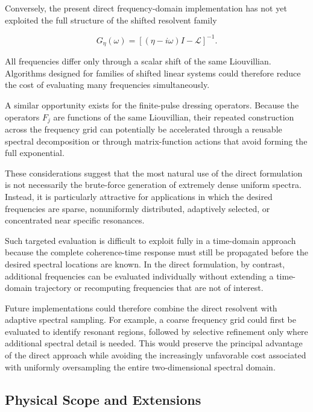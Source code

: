 \documentclass[11pt]{article}
\begin{document}
Conversely, the present direct frequency-domain implementation has not
yet exploited the full structure of the shifted resolvent family

\begin{equation}
G_\eta(\omega)
=
\left[
(\eta-i\omega)I-\mathcal{L}
\right]^{-1}.
\end{equation}

All frequencies differ only through a scalar shift of the same
Liouvillian.  Algorithms designed for families of shifted linear
systems could therefore reduce the cost of evaluating many frequencies
simultaneously.

A similar opportunity exists for the finite-pulse dressing operators.
Because the operators $F_j$ are functions of the same Liouvillian,
their repeated construction across the frequency grid can potentially
be accelerated through a reusable spectral decomposition or through
matrix-function actions that avoid forming the full exponential.

These considerations suggest that the most natural use of the direct
formulation is not necessarily the brute-force generation of extremely
dense uniform spectra.  Instead, it is particularly attractive for
applications in which the desired frequencies are sparse,
nonuniformly distributed, adaptively selected, or concentrated near
specific resonances.

Such targeted evaluation is difficult to exploit fully in a
time-domain approach because the complete coherence-time response must
still be propagated before the desired spectral locations are known.
In the direct formulation, by contrast, additional frequencies can be
evaluated individually without extending a time-domain trajectory or
recomputing frequencies that are not of interest.

Future implementations could therefore combine the direct resolvent
with adaptive spectral sampling.  For example, a coarse frequency grid
could first be evaluated to identify resonant regions, followed by
selective refinement only where additional spectral detail is needed.
This would preserve the principal advantage of the direct approach
while avoiding the increasingly unfavorable cost associated with
uniformly oversampling the entire two-dimensional spectral domain.

\subsection{Physical Scope and Extensions}
\label{subsec:physical_scope}
\end{document}
